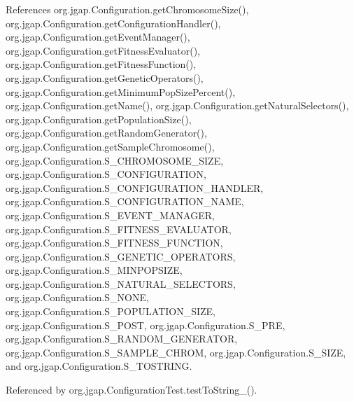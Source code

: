 References org.\-jgap.\-Configuration.\-get\-Chromosome\-Size(), org.\-jgap.\-Configuration.\-get\-Configuration\-Handler(), org.\-jgap.\-Configuration.\-get\-Event\-Manager(), org.\-jgap.\-Configuration.\-get\-Fitness\-Evaluator(), org.\-jgap.\-Configuration.\-get\-Fitness\-Function(), org.\-jgap.\-Configuration.\-get\-Genetic\-Operators(), org.\-jgap.\-Configuration.\-get\-Minimum\-Pop\-Size\-Percent(), org.\-jgap.\-Configuration.\-get\-Name(), org.\-jgap.\-Configuration.\-get\-Natural\-Selectors(), org.\-jgap.\-Configuration.\-get\-Population\-Size(), org.\-jgap.\-Configuration.\-get\-Random\-Generator(), org.\-jgap.\-Configuration.\-get\-Sample\-Chromosome(), org.\-jgap.\-Configuration.\-S\-\_\-\-C\-H\-R\-O\-M\-O\-S\-O\-M\-E\-\_\-\-S\-I\-Z\-E, org.\-jgap.\-Configuration.\-S\-\_\-\-C\-O\-N\-F\-I\-G\-U\-R\-A\-T\-I\-O\-N, org.\-jgap.\-Configuration.\-S\-\_\-\-C\-O\-N\-F\-I\-G\-U\-R\-A\-T\-I\-O\-N\-\_\-\-H\-A\-N\-D\-L\-E\-R, org.\-jgap.\-Configuration.\-S\-\_\-\-C\-O\-N\-F\-I\-G\-U\-R\-A\-T\-I\-O\-N\-\_\-\-N\-A\-M\-E, org.\-jgap.\-Configuration.\-S\-\_\-\-E\-V\-E\-N\-T\-\_\-\-M\-A\-N\-A\-G\-E\-R, org.\-jgap.\-Configuration.\-S\-\_\-\-F\-I\-T\-N\-E\-S\-S\-\_\-\-E\-V\-A\-L\-U\-A\-T\-O\-R, org.\-jgap.\-Configuration.\-S\-\_\-\-F\-I\-T\-N\-E\-S\-S\-\_\-\-F\-U\-N\-C\-T\-I\-O\-N, org.\-jgap.\-Configuration.\-S\-\_\-\-G\-E\-N\-E\-T\-I\-C\-\_\-\-O\-P\-E\-R\-A\-T\-O\-R\-S, org.\-jgap.\-Configuration.\-S\-\_\-\-M\-I\-N\-P\-O\-P\-S\-I\-Z\-E, org.\-jgap.\-Configuration.\-S\-\_\-\-N\-A\-T\-U\-R\-A\-L\-\_\-\-S\-E\-L\-E\-C\-T\-O\-R\-S, org.\-jgap.\-Configuration.\-S\-\_\-\-N\-O\-N\-E, org.\-jgap.\-Configuration.\-S\-\_\-\-P\-O\-P\-U\-L\-A\-T\-I\-O\-N\-\_\-\-S\-I\-Z\-E, org.\-jgap.\-Configuration.\-S\-\_\-\-P\-O\-S\-T, org.\-jgap.\-Configuration.\-S\-\_\-\-P\-R\-E, org.\-jgap.\-Configuration.\-S\-\_\-\-R\-A\-N\-D\-O\-M\-\_\-\-G\-E\-N\-E\-R\-A\-T\-O\-R, org.\-jgap.\-Configuration.\-S\-\_\-\-S\-A\-M\-P\-L\-E\-\_\-\-C\-H\-R\-O\-M, org.\-jgap.\-Configuration.\-S\-\_\-\-S\-I\-Z\-E, and org.\-jgap.\-Configuration.\-S\-\_\-\-T\-O\-S\-T\-R\-I\-N\-G.



Referenced by org.\-jgap.\-Configuration\-Test.\-test\-To\-String\-\_().



